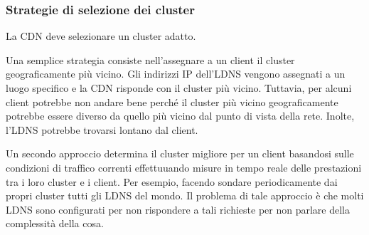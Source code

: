 \documentclass{book}
\begin{document}
\subsubsection*{Strategie di selezione dei cluster}
La CDN deve selezionare un cluster adatto.

Una semplice strategia consiste nell'assegnare a un client il cluster geograficamente più vicino. Gli indirizzi IP dell'LDNS vengono assegnati a un luogo specifico e la CDN risponde con il cluster più vicino. Tuttavia, per alcuni client potrebbe non andare bene perché il cluster più vicino geograficamente potrebbe essere diverso da quello più vicino dal punto di vista della rete. Inolte, l'LDNS potrebbe trovarsi lontano dal client.

Un secondo approccio determina il cluster migliore per un client basandosi sulle condizioni di traffico correnti effettuuando misure in tempo reale delle prestazioni tra i loro cluster e i client. Per esempio, facendo sondare periodicamente dai propri cluster tutti gli LDNS del mondo. Il problema di tale approccio è che molti LDNS sono configurati per non rispondere a tali richieste per non parlare della complessità della cosa.
\end{document}
